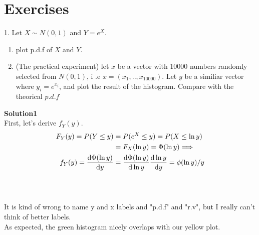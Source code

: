 \section{Exercises}
    1. Let $X \sim N(0,1)$ and $Y= e^X$.
    \begin{enumerate}
        \item plot p.d.f of $X$ and $Y$.
        \item (The practical experiment) let $x$ be a vector with 10000 numbers randomly selected from $N(0,1)$, i .e $x = (x_1,..,x_{10000})$. Let $y$ be a similiar vector where $y_i = e^{x_i}$, and plot the result of the histogram. Compare with the theorical $p.d.f$
    \end{enumerate}
    \textbf{Solution1}      \\
    First, let's derive $f_Y(y)$.
    \begin{align*}
        F_Y(y) = P(Y \le y) & = P (e^X \le y) = P( X \le \ln y) \\
                            &= F_X(\ln y ) = \Phi( \ln y) \Longrightarrow \\
                            f_Y(y) = \odv{\Phi(\ln y)}{y} &= \odv{\Phi(\ln y)}{\ln y} \odv{\ln y}{y} = \phi(\ln y) / y
    \end{align*}

    \inputminted{python}{src/chapter2/1.py} \\
    \begin{center}   \end{center}

    
    It is kind of wrong to name y and x labels and "p.d.f" and "r.v", but I really can't think of better labels.\\
    As expected, the green histogram nicely overlaps with our yellow plot.
    